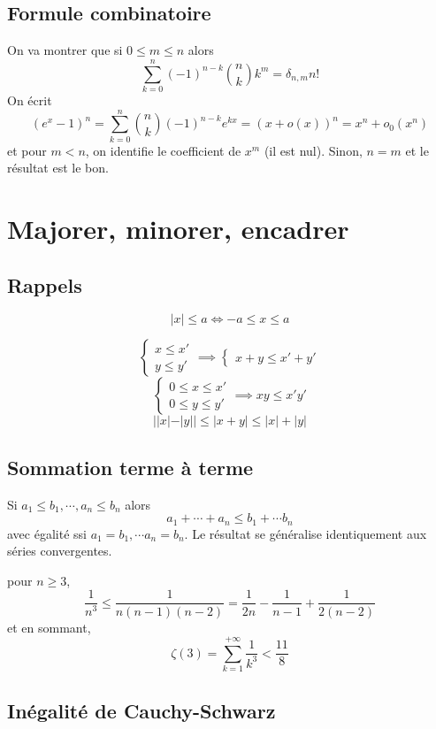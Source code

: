 \subsection{Formule combinatoire}

On va montrer que si $0\leq m\leq n$ alors \[
    \sum_{k=0}^n(-1)^{n-k}\binom nkk^m=\delta_{n,m}n!
\]
On écrit \[
    (e^x-1)^n=\sum_{k=0}^n\binom nk (-1)^{n-k}e^{kx}=(x+o(x))^n=x^n+o_0(x^n)
\]
et pour $m<n$, on identifie le coefficient de $x^m$ (il est nul). Sinon, $n=m$ et le résultat est le bon.

\section{Majorer, minorer, encadrer}

\subsection{Rappels}

\[
    |x|\leq a\iff -a\leq x\leq a
\]

\[
    \begin{cases}
        x\leq x'\\ y\leq y'
    \end{cases}
    \implies \begin{cases}
        x+y\leq x'+y'
    \end{cases}
\]
\[
    \begin{cases}
        0\leq x\leq x'\\ 0\leq y\leq y'
    \end{cases}
    \implies xy\leq x'y'
\]
\[
    ||x|-|y||\leq |x+y|\leq |x|+|y|
\]

\subsection{Sommation terme à terme}

Si $a_1\leq b_1, \cdots, a_n\leq b_n$ alors \[
    a_1+\cdots +a_n\leq b_1+\cdots b_n
\]
avec égalité ssi $a_1=b_1,\cdots a_n=b_n$. Le résultat se généralise identiquement aux séries convergentes.

\begin{ex}
    pour $n\geq 3$, \[
        \frac1{n^3}\leq \frac1{n(n-1)(n-2)}=\frac1{2n}-\frac1{n-1}+\frac1{2(n-2)}
    \]
    et en sommant, \[
        \zeta(3)=\sum_{k=1}^{+\infty}\frac1{k^3}< \frac{11}8
    \]
\end{ex}

\subsection{Inégalité de Cauchy-Schwarz}

